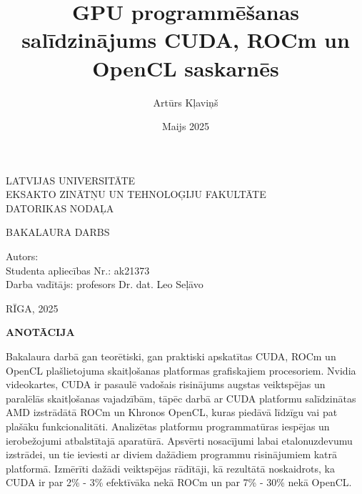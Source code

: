 \documentclass[12pt]{report}%
\author{Artūrs Kļaviņš}
\title{GPU programmēšanas salīdzinājums CUDA, ROCm un OpenCL saskarnēs}
\date{Maijs 2025}
\theoremstyle{definition}
\def\degree{Bakalaura darbs}
\def\faculty{Eksakto zinātņu un tehnoloģiju fakultāte}
\def\department{Datorikas nodaļa}
\def\vietlaiks{Rīga, 2025}
\def\supervisor{Darba vadītājs: profesors Dr. dat. Leo Seļāvo}
\def\studaplieciba{ak21373}
\begin{document}
\thispagestyle{empty}
\makeatletter
   \begin{center}
       \vspace*{1cm}
        
    \vspace{10mm}
    {\Large LATVIJAS UNIVERSITĀTE\\
    \MakeUppercase{\faculty}\\
    \vspace{2mm}
    \MakeUppercase{\department}
    }
    \vspace*{10mm}
    
    
    
    \vspace{5mm}
    {\Large \MakeUppercase{\textbf{\@title}}}
    \vspace{5mm}
    

       \vspace{1cm}
    \Large
    \MakeUppercase{\degree}
    \end{center}
    \vspace{3cm}
    \begin{flushleft}
    \large
       Autors: \textbf{\large \@author}\\
       Studenta apliecības Nr.: \studaplieciba \\
       \supervisor
    \end{flushleft}

       \vfill
     
    \begin{center}
    \Large      
    \MakeUppercase{\vietlaiks}
   \end{center}
\makeatother

\newpage




\thispagestyle{empty}
\noindent \textbf{\MakeUppercase{Anotācija}}

\noindent Bakalaura darbā gan teorētiski, gan praktiski apskatītas CUDA, ROCm
un OpenCL  plašlietojuma skaitļošanas platformas grafiskajiem procesoriem.
Nvidia videokartes, CUDA ir pasaulē vadošais risinājums augstas veiktspējas un
paralēlās skaitļošanas vajadzībām, tāpēc darbā ar CUDA platformu salīdzinātas AMD
izstrādātā ROCm un Khronos OpenCL, kuras piedāvā līdzīgu vai pat plašāku
funkcionalitāti. Analizētas platformu programmatūras iespējas un ierobežojumi
atbalstītajā aparatūrā. Apsvērti nosacījumi labai etalonuzdevumu izstrādei, un
tie ieviesti ar diviem dažādiem programmu risinājumiem katrā platformā.
Izmērīti dažādi veiktspējas rādītāji, kā rezultātā noskaidrots, ka CUDA ir par
2\% - 3\% efektīvāka nekā ROCm un par 7\% - 30\% nekā OpenCL. 
\end{document}
